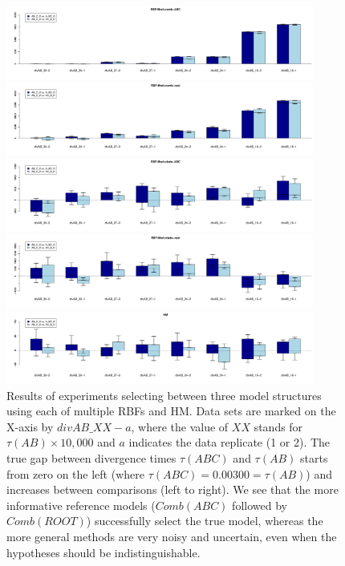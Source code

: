 \documentclass[11pt]{article}
\newcommand{\1}{\mathbbm{1}}
\begin{document}
\begin{figure}[H]

\includegraphics[width=0.9\textwidth]{results/results-M4-divAB/M4-divAB-results-comb_ABC}

\includegraphics[width=0.9\textwidth]{results/results-M4-divAB/M4-divAB-results-comb_ROOT}

\includegraphics[width=0.9\textwidth]{results/results-M4-divAB/M4-divAB-results-clade_ABC}

\includegraphics[width=0.9\textwidth]{results/results-M4-divAB/M4-divAB-results-clade_ROOT}

\includegraphics[width=0.9\textwidth]{results/results-M4-divAB/M4-divAB-results-HM}

\captionsetup{width=0.8\textwidth}
\caption{ 
Results of experiments selecting between three model structures using each of multiple RBFs and HM.
%
Data sets are marked on the X-axis by $divAB\_XX-a$, where the value of $XX$ stands for $\tau(AB) \times 10,000$ and $a$ indicates the data replicate (1 or 2).
%
The true gap between divergence times $\tau(ABC)$ and $\tau(AB)$ starts from zero on the left (where $\tau(ABC) = 0.00300 = \tau(AB)$) and increases between comparisons (left to right).
%
We see that the more informative reference models ($Comb(ABC)$ followed by $Comb(ROOT)$) successfully select the true model, whereas the  more general methods are very noisy and uncertain, even when the hypotheses should be indistinguishable.}
\label{fig:results-M4-divAB}
\end{figure}
\end{document}
